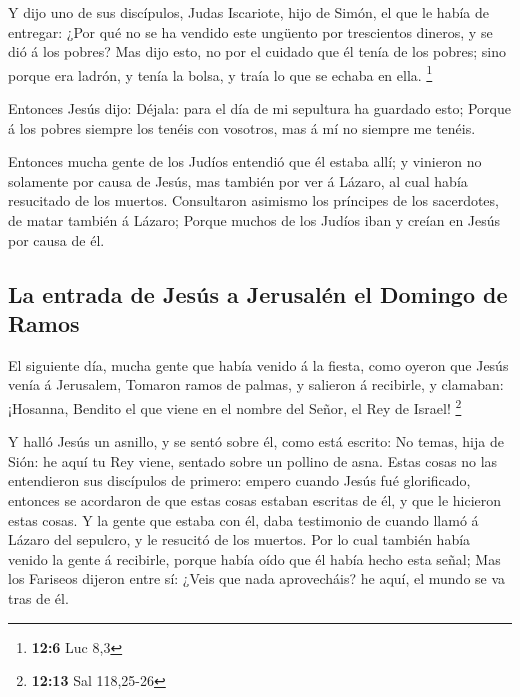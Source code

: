  Y dijo uno de sus discípulos, Judas Iscariote, hijo de
Simón, el que le había de entregar:  ¿Por qué no se ha
vendido este ungüento por trescientos dineros, y se dió á los pobres?
 Mas dijo esto, no por el cuidado que él tenía de los
pobres; sino porque era ladrón, y tenía la bolsa, y traía lo que se
echaba en ella. \footnote{\textbf{12:6} Luc 8,3}

 Entonces Jesús dijo: Déjala: para el día de mi sepultura
ha guardado esto;  Porque á los pobres siempre los tenéis
con vosotros, mas á mí no siempre me tenéis.

 Entonces mucha gente de los Judíos entendió que él estaba
allí; y vinieron no solamente por causa de Jesús, mas también por ver á
Lázaro, al cual había resucitado de los muertos. 
Consultaron asimismo los príncipes de los sacerdotes, de matar también á
Lázaro;  Porque muchos de los Judíos iban y creían en
Jesús por causa de él.

\hypertarget{la-entrada-de-jesuxfas-a-jerusaluxe9n-el-domingo-de-ramos}{%
\subsection{La entrada de Jesús a Jerusalén el Domingo de
Ramos}\label{la-entrada-de-jesuxfas-a-jerusaluxe9n-el-domingo-de-ramos}}

 El siguiente día, mucha gente que había venido á la
fiesta, como oyeron que Jesús venía á Jerusalem,  Tomaron
ramos de palmas, y salieron á recibirle, y clamaban: ¡Hosanna, Bendito
el que viene en el nombre del Señor, el Rey de Israel! \footnote{\textbf{12:13}
  Sal 118,25-26}

 Y halló Jesús un asnillo, y se sentó sobre él, como está
escrito:  No temas, hija de Sión: he aquí tu Rey viene,
sentado sobre un pollino de asna.  Estas cosas no las
entendieron sus discípulos de primero: empero cuando Jesús fué
glorificado, entonces se acordaron de que estas cosas estaban escritas
de él, y que le hicieron estas cosas.  Y la gente que
estaba con él, daba testimonio de cuando llamó á Lázaro del sepulcro, y
le resucitó de los muertos.  Por lo cual también había
venido la gente á recibirle, porque había oído que él había hecho esta
señal;  Mas los Fariseos dijeron entre sí: ¿Veis que nada
aprovecháis? he aquí, el mundo se va tras de él.

